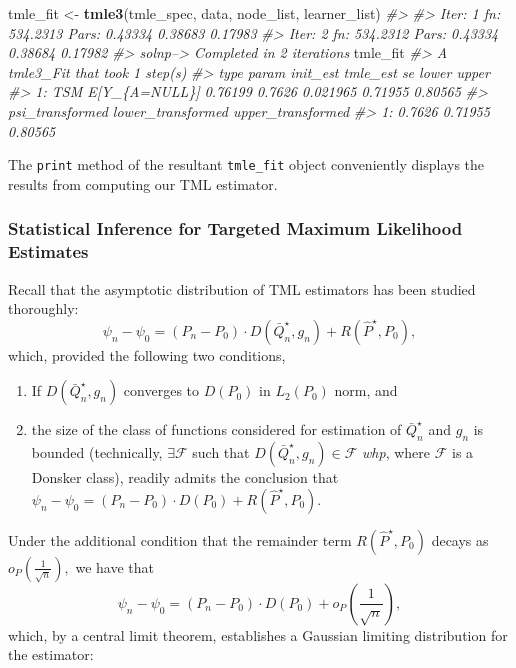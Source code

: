 \documentclass[12pt, krantz2,]{krantz}
\newenvironment{Shaded}{\begin{snugshade}}{\end{snugshade}}
\newcommand{\CommentTok}[1]{\textcolor[rgb]{0.37,0.37,0.37}{\textit{#1}}}
\newcommand{\KeywordTok}[1]{\textcolor[rgb]{0.27,0.27,0.27}{\textbf{#1}}}
\newcommand{\NormalTok}[1]{#1}
\newcommand{\StringTok}[1]{\textcolor[rgb]{0.5,0.5,0.5}{#1}}
\providecommand{\tightlist}{%
  \setlength{\itemsep}{0pt}\setlength{\parskip}{0pt}}
\theoremstyle{definition}
\theoremstyle{definition}
\theoremstyle{definition}
\newcommand{\1}{\mathbbm{1}}
\begin{document}
\begin{Shaded}
\begin{Highlighting}[]
\NormalTok{tmle_fit <-}\StringTok{ }\KeywordTok{tmle3}\NormalTok{(tmle_spec, data, node_list, learner_list)}
\CommentTok{#> }
\CommentTok{#> Iter: 1 fn: 534.2313  Pars:  0.43334 0.38683 0.17983}
\CommentTok{#> Iter: 2 fn: 534.2312  Pars:  0.43334 0.38684 0.17982}
\CommentTok{#> solnp--> Completed in 2 iterations}
\NormalTok{tmle_fit}
\CommentTok{#> A tmle3_Fit that took 1 step(s)}
\CommentTok{#>    type         param init_est tmle_est       se   lower   upper}
\CommentTok{#> 1:  TSM E[Y_\{A=NULL\}]  0.76199   0.7626 0.021965 0.71955 0.80565}
\CommentTok{#>    psi_transformed lower_transformed upper_transformed}
\CommentTok{#> 1:          0.7626           0.71955           0.80565}
\end{Highlighting}
\end{Shaded}

The \texttt{print} method of the resultant \texttt{tmle\_fit} object conveniently displays the
results from computing our TML estimator.

\hypertarget{statistical-inference-for-targeted-maximum-likelihood-estimates}{%
\subsubsection{Statistical Inference for Targeted Maximum Likelihood Estimates}\label{statistical-inference-for-targeted-maximum-likelihood-estimates}}

Recall that the asymptotic distribution of TML estimators has been studied
thoroughly:
\[\psi_n - \psi_0 = (P_n - P_0) \cdot D(\bar{Q}_n^{\star}, g_n) +
R(\hat{P}^{\star}, P_0),\]
which, provided the following two conditions,

\begin{enumerate}
\def\labelenumi{\arabic{enumi}.}
\tightlist
\item
  If \(D(\bar{Q}_n^{\star}, g_n)\) converges to \(D(P_0)\) in \(L_2(P_0)\) norm, and
\item
  the size of the class of functions considered for estimation of
  \(\bar{Q}_n^{\star}\) and \(g_n\) is bounded (technically, \(\exists \mathcal{F}\)
  such that \(D(\bar{Q}_n^{\star}, g_n) \in \mathcal{F}\) \emph{whp}, where
  \(\mathcal{F}\) is a Donsker class),
  readily admits the conclusion that
  \(\psi_n - \psi_0 = (P_n - P_0) \cdot D(P_0) + R(\hat{P}^{\star}, P_0)\).
\end{enumerate}

Under the additional condition that the remainder term \(R(\hat{P}^{\star}, P_0)\)
decays as \(o_P \left( \frac{1}{\sqrt{n}} \right),\) we have that
\[\psi_n - \psi_0 = (P_n - P_0) \cdot D(P_0) + o_P \left( \frac{1}{\sqrt{n}}
\right),\]
which, by a central limit theorem, establishes a Gaussian limiting distribution
for the estimator:
\end{document}
